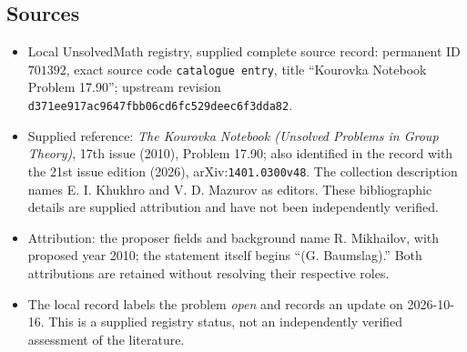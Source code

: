 \documentclass[11pt]{article}
\begin{document}
\subsection{Sources}
\begin{itemize}
\item Local UnsolvedMath registry, supplied complete source record: permanent ID \(701392\), exact source code \texttt{catalogue entry}, title ``Kourovka Notebook Problem 17.90''; upstream revision \texttt{d371ee917ac9647fbb06cd6fc529deec6f3dda82}.
\item Supplied reference: \emph{The Kourovka Notebook (Unsolved Problems in Group Theory)}, 17th issue (2010), Problem 17.90; also identified in the record with the 21st issue edition (2026), arXiv:\texttt{1401.0300v48}. The collection description names E. I. Khukhro and V. D. Mazurov as editors. These bibliographic details are supplied attribution and have not been independently verified.
\item Attribution: the proposer fields and background name R. Mikhailov, with proposed year 2010; the statement itself begins ``(G. Baumslag).'' Both attributions are retained without resolving their respective roles.
\item The local record labels the problem \emph{open} and records an update on 2026-10-16. This is a supplied registry status, not an independently verified assessment of the literature.
\end{itemize}
\end{document}
